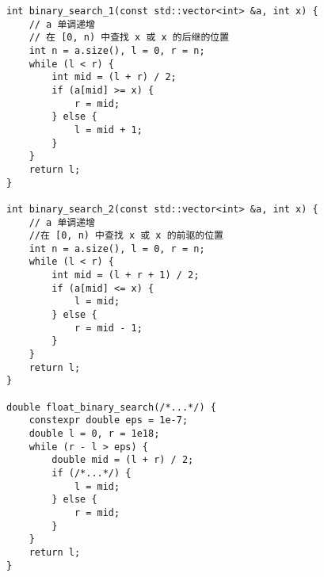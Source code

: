 \begin{lstlisting}
int binary_search_1(const std::vector<int> &a, int x) {
	// a 单调递增
	// 在 [0, n) 中查找 x 或 x 的后继的位置
	int n = a.size(), l = 0, r = n;
	while (l < r) {
		int mid = (l + r) / 2;
		if (a[mid] >= x) {
			r = mid;
		} else {
			l = mid + 1;
		}
	}
	return l;
}

int binary_search_2(const std::vector<int> &a, int x) {
	// a 单调递增
	//在 [0, n) 中查找 x 或 x 的前驱的位置
	int n = a.size(), l = 0, r = n;
	while (l < r) {
		int mid = (l + r + 1) / 2;
		if (a[mid] <= x) {
			l = mid;
		} else {
			r = mid - 1;
		}
	}
	return l;
}

double float_binary_search(/*...*/) {
	constexpr double eps = 1e-7;
	double l = 0, r = 1e18;
	while (r - l > eps) {
		double mid = (l + r) / 2;
		if (/*...*/) {
			l = mid;
		} else {
			r = mid;
		}
	}
	return l;
}
\end{lstlisting}
